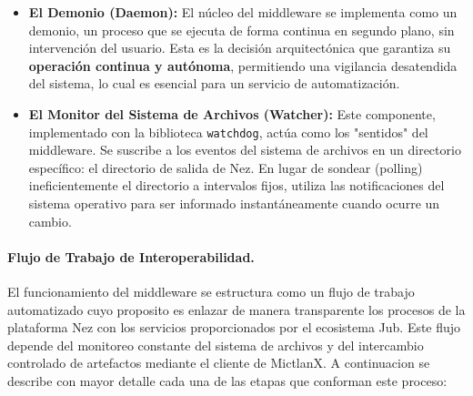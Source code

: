 \begin{itemize}
    \item \textbf{El Demonio (Daemon):} El núcleo del middleware se implementa como un demonio, un proceso que se ejecuta de forma continua en segundo plano, sin intervención del usuario. Esta es la decisión arquitectónica que garantiza su \textbf{operación continua y autónoma}, permitiendo una vigilancia desatendida del sistema, lo cual es esencial para un servicio de automatización.
    \item \textbf{El Monitor del Sistema de Archivos (Watcher):} Este componente, implementado con la biblioteca \texttt{watchdog}, actúa como los "sentidos" del middleware. Se suscribe a los eventos del sistema de archivos en un directorio específico: el directorio de salida de Nez. En lugar de sondear (polling) ineficientemente el directorio a intervalos fijos, utiliza las notificaciones del sistema operativo para ser informado instantáneamente cuando ocurre un cambio.
\end{itemize}

\paragraph{Flujo de Trabajo de Interoperabilidad.}

El funcionamiento del middleware se estructura como un flujo de trabajo automatizado cuyo proposito es enlazar de manera transparente los procesos de la plataforma Nez con los servicios proporcionados por el ecosistema Jub. Este flujo depende del monitoreo constante del sistema de archivos y del intercambio controlado de artefactos mediante el cliente de MictlanX. A continuacion se describe con mayor detalle cada una de las etapas que conforman este proceso:

